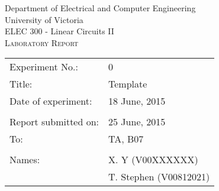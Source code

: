 \begin{center}
	\begin{LARGE}
		Department of Electrical and Computer Engineering \\
		University of Victoria \\
		ELEC 300 - Linear Circuits II \\[1cm]
		\textsc{Laboratory Report}
		\\[1cm]
	\end{LARGE}
\end{center}

\begin{tabular}{ p{} p{} }
	Experiment No.: & 0 \\ 
	Title: & Template \\ 
	Date of experiment:& 18 June, 2015 \\ 
	& \\
	Report submitted on:& 25 June, 2015 \\ 
	To: & TA, B07 \\ 
	& \\
	Names: & X. Y (V00XXXXXX)\\
	& T. Stephen (V00812021)  
\end{tabular}

\newpage